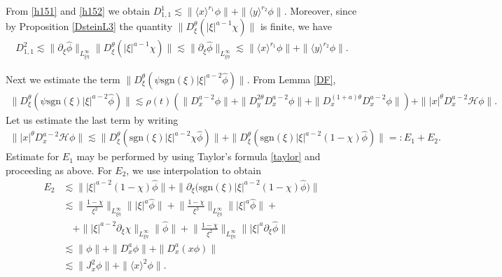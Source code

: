 \documentclass[reqno]{amsart}
\newcommand{\ha}{\hat{\phi}}
\newcommand{\les}{\lesssim}
\newcommand{\lanx}{\langle x \rangle}
\newcommand{\lany}{\langle y \rangle}
\newcommand{\h}{\mathcal H}
\newcommand{\dte}{D^{\theta}_\xi}
\newcommand{\p}{\partial}
\newcommand{\sgn}{\text{sgn}}
\numberwithin{equation}{section}
\begin{document}
From \eqref{h151} and \eqref{h152} we obtain $D_{1,1}^1\les \|\lanx^{r_1}\phi\|+\|\lany^{r_2}\phi\|$. Moreover, since by  Proposition \ref{DsteinL3} the quantity $\|\dte(|\xi|^{a-1}\chi)\|$ is finite, we have
\begin{equation*}
\begin{split}
D_{1,1}^2 \les \|\p_\xi \ha\|_{L^\infty_{\xi \eta}}\|\dte(|\xi|^{a-1}\chi)\|
\les  \|\p_\xi \ha\|_{L^\infty_{\xi \eta}}
\les  \|\lanx^{r_1}\phi\|+\|\lany^{r_2}\phi\|.
\end{split}
\end{equation*}

Next we estimate the term $\|\dte(\psi \sgn(\xi) |\xi|^{a-2}\ha)\|$. From Lemma \ref{DF},
\begin{equation*}
\begin{split}
\|\dte(\psi \sgn(\xi)|\xi|^{a-2}\ha)\|\les  \rho(t) (\|D_x^{a-2}\phi\|+\|D_y^{2\theta}D_x^{a-2}\phi\|+\|D_x^{(1+a)\theta}D_x^{a-2}\phi\|)+\||x|^\theta D_x^{a-2}\h\phi\|.
\end{split}
\end{equation*}
Let us estimate the last term by writing
\begin{equation*}
\begin{split}
\||x|^\theta D_x^{a-2}\h\phi\|\les \|\dte(\sgn(\xi)|\xi|^{a-2}\chi \ha)\|+\|\dte(\sgn(\xi)|\xi|^{a-2}(1-\chi)\ha)\|
=:E_1+E_2.
\end{split}
\end{equation*}
Estimate for $E_1$ may be performed by using Taylor's formula \eqref{taylor} and proceeding as above. For $E_2$, we use interpolation to obtain
\begin{equation*}
\begin{split}
E_2&\les \||\xi|^{a-2}(1-\chi)\ha\|+\|\p_\xi \big(\sgn(\xi)|\xi|^{a-2}(1-\chi)\ha\big)\|\\
&\les \Big\|\frac{1-\chi}{\xi^2} \Big\|_{L^\infty_{\xi \eta}}\||\xi|^a \ha\|+\Big\|\frac{1-\chi}{\xi^3}\Big\|_{L^\infty_{\xi \eta}} \||\xi|^a\ha\|+\\
&\quad+\||\xi|^{a-2}\p_\xi \chi\|_{L^\infty_{\xi \eta}}\| \ha\|+\Big\|\frac{1-\chi}{\xi^2}\Big\|_{L^\infty_{\xi \eta}} \||\xi|^a\p_\xi\ha\|\\
&\les \|\phi\|+\|D_x^a \phi\|+\|D_x^a(x\phi)\|\\
&\les \|J_x^2 \phi\|+\|\lanx^2 \phi\|.
\end{split}
\end{equation*}
 
\end{document}

